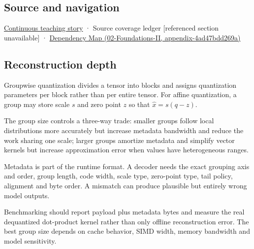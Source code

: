 \subsection{Source and navigation}\label{appendix-638204c40e8b-source-and-navigation}

\hyperref[01-foundations-i-ch001-choosing-what-information-to-keep]{Continuous teaching story} · {Source coverage ledger {[}referenced section unavailable{]}} · \href{../02-Foundations-II/main.pdf\#nameddest=appendix-4ad47bdd269a}{Dependency Map (02-Foundations-II, appendix-4ad47bdd269a)}

\subsection{Reconstruction depth}\label{appendix-638204c40e8b-reconstruction-depth}

Groupwise quantization divides a tensor into blocks and assigns quantization parameters per block rather than per entire tensor. For affine quantization, a group may store scale \(s\) and zero point \(z\) so that \(\hat x=s(q-z)\).

The group size controls a three-way trade: smaller groups follow local distributions more accurately but increase metadata bandwidth and reduce the work sharing one scale; larger groups amortize metadata and simplify vector kernels but increase approximation error when values have heterogeneous ranges.

Metadata is part of the runtime format. A decoder needs the exact grouping axis and order, group length, code width, scale type, zero-point type, tail policy, alignment and byte order. A mismatch can produce plausible but entirely wrong model outputs.

Benchmarking should report payload plus metadata bytes and measure the real dequantized dot-product kernel rather than only offline reconstruction error. The best group size depends on cache behavior, SIMD width, memory bandwidth and model sensitivity.
